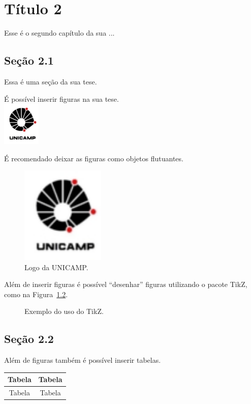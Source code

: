 \chapter{T\'itulo 2}
Esse \'e o segundo cap\'itulo da sua ...

\section{Se\c c\~ao 2.1}
Essa é uma seção da sua tese.

É possível inserir figuras na sua tese. \\
\includegraphics{figuras/unicamp-simbolo.jpg}

É recomendado deixar as figuras como objetos flutuantes.
\begin{figure}[!htb]
    \center
    \includegraphics[width=4cm]{figuras/unicamp-simbolo.jpg}
    \caption{Logo da UNICAMP.}
    \label{fig:log_unicamp}
\end{figure}

Além de inserir figuras é possível ``desenhar'' figuras utilizando o pacote
TikZ, como na Figura~\ref{fig:exem_tikz}.
\begin{figure}[!htb]
\centering
{}
\caption{Exemplo do uso do TikZ.}
\label{fig:exem_tikz}
\end{figure}

\section{Seção 2.2}
Além de figuras também é possível inserir tabelas. \\
\begin{tabular}{|c|c|}
\hline
Tabela & Tabela \\ \hline
Tabela & Tabela \\ \hline
\end{tabular}

